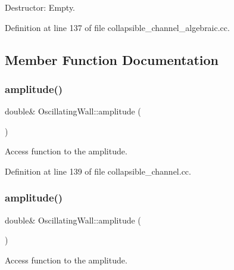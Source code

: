 Destructor\+: Empty. 



Definition at line 137 of file collapsible\+\_\+channel\+\_\+algebraic.\+cc.



\subsection{Member Function Documentation}
\mbox{\label{classOscillatingWall_ae923c6a7abefe33efaf47a4b69d1b621}} 
\subsubsection{\texorpdfstring{amplitude()}{amplitude()}\hspace{0.1cm}{\footnotesize\ttfamily [1/2]}}
{\footnotesize\ttfamily double\& Oscillating\+Wall\+::amplitude (\begin{DoxyParamCaption}{ }\end{DoxyParamCaption})\hspace{0.3cm}{\ttfamily [inline]}}



Access function to the amplitude. 



Definition at line 139 of file collapsible\+\_\+channel.\+cc.

\mbox{\label{classOscillatingWall_ae923c6a7abefe33efaf47a4b69d1b621}} 
\subsubsection{\texorpdfstring{amplitude()}{amplitude()}\hspace{0.1cm}{\footnotesize\ttfamily [2/2]}}
{\footnotesize\ttfamily double\& Oscillating\+Wall\+::amplitude (\begin{DoxyParamCaption}{ }\end{DoxyParamCaption})\hspace{0.3cm}{\ttfamily [inline]}}



Access function to the amplitude. 



